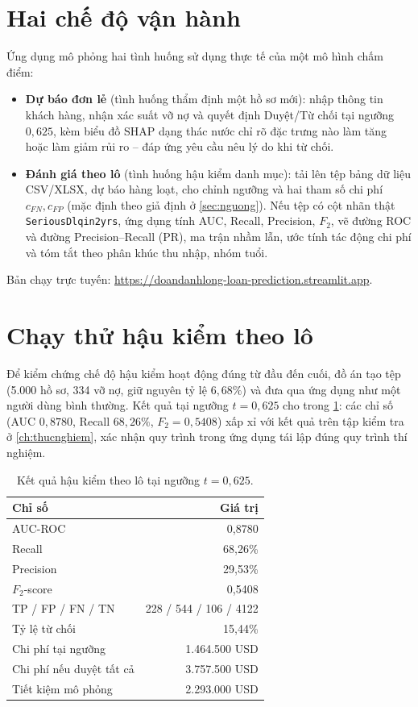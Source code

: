 \documentclass[12pt,a4paper,oneside]{report}
\theoremstyle{vnplain}
\theoremstyle{vndef}
\begin{document}
\section{Hai chế độ vận hành}
Ứng dụng mô phỏng hai tình huống sử dụng thực tế của một mô hình chấm điểm:
\begin{itemize}
  \item \textbf{Dự báo đơn lẻ} (tình huống thẩm định một hồ sơ mới): nhập thông tin
        khách hàng, nhận xác suất vỡ nợ và quyết định Duyệt/Từ chối tại ngưỡng
        $0{,}625$, kèm biểu đồ SHAP dạng thác nước chỉ rõ đặc trưng nào làm tăng hoặc
        làm giảm rủi ro -- đáp ứng yêu cầu nêu lý do khi từ chối.
  \item \textbf{Đánh giá theo lô} (tình huống hậu kiểm danh mục): tải lên tệp bảng dữ liệu
        CSV/XLSX,
        dự báo hàng loạt, cho chỉnh ngưỡng và hai tham số chi phí $c_{FN},c_{FP}$ (mặc
        định theo giả định ở \cref{sec:nguong}). Nếu tệp có cột nhãn thật
        \texttt{SeriousDlqin2yrs}, ứng dụng tính AUC, Recall, Precision, $F_2$, vẽ
        đường ROC và đường Precision--Recall (PR), ma trận nhầm lẫn, ước tính tác động chi phí và tóm tắt theo phân khúc
        thu nhập, nhóm tuổi.
\end{itemize}
Bản chạy trực tuyến: \url{https://doandanhlong-loan-prediction.streamlit.app}.

\section{Chạy thử hậu kiểm theo lô}
Để kiểm chứng chế độ hậu kiểm hoạt động đúng từ đầu đến cuối, đồ án tạo tệp
 (5.000 hồ sơ, 334 vỡ nợ, giữ nguyên tỷ lệ
$6{,}68\%$) và đưa qua ứng dụng như một người dùng bình thường. Kết quả tại ngưỡng
$t=0{,}625$ cho trong \cref{tab:batch}: các chỉ số (AUC $0{,}8780$, Recall $68{,}26\%$,
$F_2=0{,}5408$) xấp xỉ với kết quả trên tập kiểm tra ở \cref{ch:thucnghiem}, xác nhận
quy trình trong ứng dụng tái lập đúng quy trình thí nghiệm.

\begin{table}[htbp]\centering
\caption{Kết quả hậu kiểm theo lô tại ngưỡng $t=0{,}625$.}
\label{tab:batch}
\begin{tabular}{l r}
\toprule
\textbf{Chỉ số} & \textbf{Giá trị}\\
\midrule
AUC-ROC & 0,8780\\
Recall & 68,26\%\\
Precision & 29,53\%\\
$F_2$-score & 0,5408\\
TP / FP / FN / TN & 228 / 544 / 106 / 4122\\
Tỷ lệ từ chối & 15,44\%\\
Chi phí tại ngưỡng & 1.464.500 USD\\
Chi phí nếu duyệt tất cả & 3.757.500 USD\\
Tiết kiệm mô phỏng & 2.293.000 USD\\
\bottomrule
\end{tabular}
\end{table}
\end{document}
